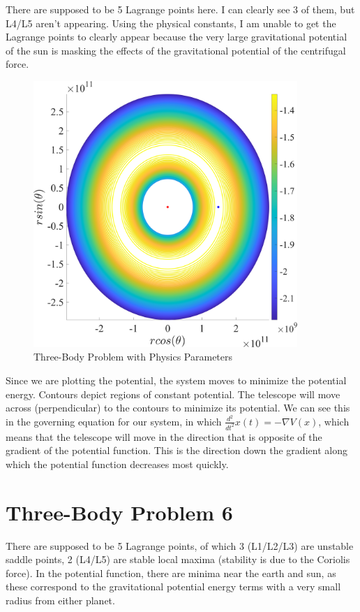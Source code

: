 \documentclass[11pt]{article}
\begin{document}
There are supposed to be 5 Lagrange points here. I can clearly see 3 of them, but L4/L5 aren't appearing. Using the physical constants, I am unable to get the Lagrange points to clearly appear because the very large gravitational potential of the sun is masking the effects of the gravitational potential of the centrifugal force.

\begin{figure}[h]
\centering
\includegraphics[width=10cm]{three_body_prob_phys.png}
\caption{Three-Body Problem with Physics Parameters}
\label{zero}
\end{figure}
 
Since we are plotting the potential, the system moves to minimize the potential energy. Contours depict regions of constant potential. The telescope will move across (perpendicular) to the contours to minimize its potential. We can see this in the governing equation for our system, in which $\frac{d^2}{dt^2} x(t) = - \nabla V(x)$, which means that the telescope will move in the direction that is opposite of the gradient of the potential function. This is the direction down the gradient along which the potential function decreases most quickly.

\section *{Three-Body Problem 6}
There are supposed to be 5 Lagrange points, of which 3 (L1/L2/L3) are unstable saddle points, 2 (L4/L5) are stable local maxima (stability is due to the Coriolis force). In the potential function, there are minima near the earth and sun, as these correspond to the gravitational potential energy terms with a very small radius from either planet. 
\end{document}
